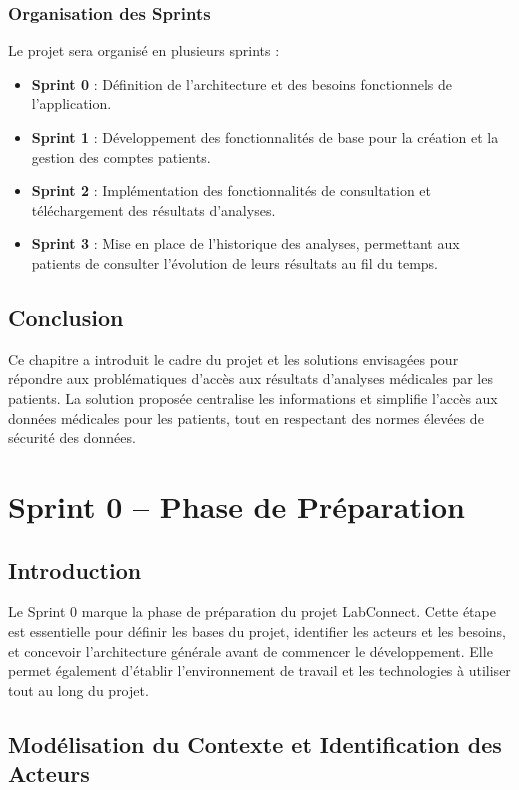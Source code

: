 \documentclass[12pt,a4paper]{report}
\begin{document}
\subsection{Organisation des Sprints}
Le projet sera organisé en plusieurs sprints :

\begin{itemize}
    \item \textbf{Sprint 0} : Définition de l'architecture et des besoins fonctionnels de l'application.
    \item \textbf{Sprint 1} : Développement des fonctionnalités de base pour la création et la gestion des comptes patients.
    \item \textbf{Sprint 2} : Implémentation des fonctionnalités de consultation et téléchargement des résultats d'analyses.
    \item \textbf{Sprint 3} : Mise en place de l'historique des analyses, permettant aux patients de consulter l'évolution de leurs résultats au fil du temps.
\end{itemize}

\section{Conclusion}
Ce chapitre a introduit le cadre du projet et les solutions envisagées pour répondre aux problématiques d'accès aux résultats d'analyses médicales par les patients. La solution proposée centralise les informations et simplifie l'accès aux données médicales pour les patients, tout en respectant des normes élevées de sécurité des données.


\chapter{Sprint 0 – Phase de Préparation}

\section{Introduction}
Le Sprint 0 marque la phase de préparation du projet LabConnect. Cette étape est essentielle pour définir les bases du projet, identifier les acteurs et les besoins, et concevoir l'architecture générale avant de commencer le développement. Elle permet également d'établir l'environnement de travail et les technologies à utiliser tout au long du projet.

\section{Modélisation du Contexte et Identification des Acteurs}
\end{document}
